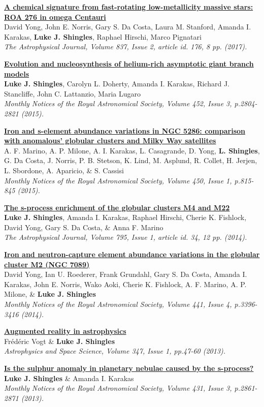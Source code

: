 \documentclass[11pt]{res} %
\newcommand{\highlight}[1]{\textbf{#1}}
\newcommand{\articletitle}[1]{{\textbf{\color{black} #1}}\\}
\newcommand{\articleauthors}[1]{#1\\}
\newcommand{\articlejournalref}[1]{\textit{#1}}
\begin{document}
\begin{resume}
\articletitle{\href{http://adsabs.harvard.edu/abs/2017ApJ...837..176Y}{A chemical signature from fast-rotating low-metallicity massive stars: ROA 276 in omega Centauri}}
\articleauthors{David Yong, John E. Norris, Gary S. Da Costa, Laura M. Stanford, Amanda I. Karakas, \highlight{Luke J. Shingles}, Raphael Hirschi, Marco Pignatari}
\articlejournalref{The Astrophysical Journal, Volume 837, Issue 2, article id. 176, 8 pp. (2017).}

\articletitle{\href{http://adsabs.harvard.edu/abs/2015MNRAS.452.2804S}{Evolution and nucleosynthesis of helium-rich asymptotic giant branch models}}
\articleauthors{\highlight{Luke J. Shingles}, Carolyn L. Doherty, Amanda I. Karakas, Richard J. Stancliffe, John C. Lattanzio, Maria Lugaro}
\articlejournalref{Monthly Notices of the Royal Astronomical Society, Volume 452, Issue 3, p.2804-2821 (2015).}

\articletitle{\href{http://adsabs.harvard.edu/abs/2015MNRAS.450..815M}{Iron and s-element abundance variations in NGC 5286: comparison with anomalous' globular clusters and Milky Way satellites}}
\articleauthors{A. F. Marino, A. P. Milone, A. I. Karakas, L. Casagrande, D. Yong, \highlight{L. Shingles}, G. Da Costa, J. Norris, P. B. Stetson,  K. Lind, M. Asplund, R. Collet, H. Jerjen, L. Sbordone, A. Aparicio, \& S. Cassisi}
\articlejournalref{Monthly Notices of the Royal Astronomical Society, Volume 450, Issue 1, p.815-845 (2015).}

\articletitle{\href{http://adsabs.harvard.edu/abs/2014ApJ...795...34S}{The s-process enrichment of the globular clusters M4 and M22}}
\articleauthors{\highlight{Luke J. Shingles}, Amanda I. Karakas, Raphael Hirschi, Cherie K. Fishlock, David Yong, Gary S. Da Costa, \& Anna F. Marino}
\articlejournalref{The Astrophysical Journal, Volume 795, Issue 1, article id. 34, 12 pp. (2014).}

\articletitle{\href{http://adsabs.harvard.edu/abs/2014MNRAS.441.3396Y}{Iron and neutron-capture element abundance variations in the globular cluster M2 (NGC 7089)}}
\articleauthors{David Yong, Ian U. Roederer, Frank Grundahl, Gary S. Da Costa, Amanda I. Karakas, John E. Norris, Wako Aoki, Cherie K. Fishlock, A. F. Marino, A. P. Milone, \& \highlight{Luke J. Shingles}}
\articlejournalref{Monthly Notices of the Royal Astronomical Society, Volume 441, Issue 4, p.3396-3416 (2014).}

\articletitle{\href{http://adsabs.harvard.edu/abs/2013Ap\%26SS.347...47V}{Augmented reality in astrophysics}}
\articleauthors{Fr\'{e}d\'{e}ric Vogt \& \highlight{Luke J. Shingles}}
\articlejournalref{Astrophysics and Space Science, Volume 347, Issue 1, pp.47-60 (2013).}

\articletitle{\href{http://adsabs.harvard.edu/abs/2013MNRAS.431.2861S}{Is the sulphur anomaly in planetary nebulae caused by the s-process?}}
\articleauthors{\highlight{Luke J. Shingles} \& Amanda I. Karakas}
\articlejournalref{Monthly Notices of the Royal Astronomical Society, Volume 431, Issue 3, p.2861-2871 (2013).}

\end{resume}
\end{document}

